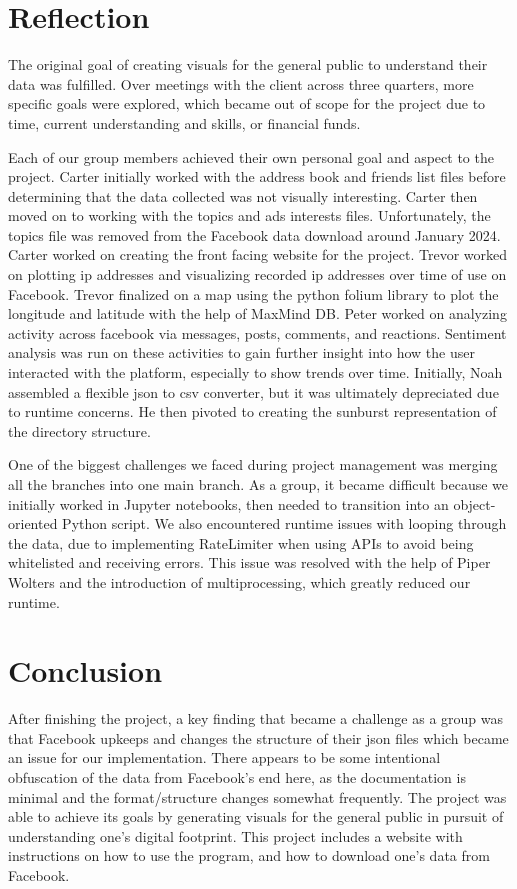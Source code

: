 \documentclass[conference, letterpaper, 11pt]{IEEEtran}
\begin{document}
\section{Reflection} \label{RE}
The original goal of creating visuals for the general public to understand their data was fulfilled. Over meetings with the client across three quarters, more specific goals were explored, which became out of scope for the project due to time, current understanding and skills, or financial funds.

Each of our group members achieved their own personal goal and aspect to the project. Carter initially worked with the address book and friends list files before determining that the data collected was not visually interesting. Carter then moved on to working with the topics and ads interests files. Unfortunately, the topics file was removed from the Facebook data download around January 2024. Carter worked on creating the front facing website for the project. Trevor worked on plotting ip addresses and visualizing recorded ip addresses over time of use on Facebook. Trevor finalized on a map using the python folium library to plot the longitude and latitude with the help of MaxMind DB. Peter worked on analyzing activity across facebook via messages, posts, comments, and reactions. Sentiment analysis was run on these activities to gain further insight into how the user interacted with the platform, especially to show trends over time. Initially, Noah assembled a flexible json to csv converter, but it was ultimately depreciated due to runtime concerns. He then pivoted to creating the sunburst representation of the directory structure.

One of the biggest challenges we faced during project management was merging all the branches into one main branch. As a group, it became difficult because we initially worked in Jupyter notebooks, then needed to transition into an object-oriented Python script. We also encountered runtime issues with looping through the data, due to implementing RateLimiter when using APIs to avoid being whitelisted and receiving errors. This issue was resolved with the help of Piper Wolters and the introduction of multiprocessing, which greatly reduced our runtime.

\section{Conclusion} \label{CO}
After finishing the project, a key finding that became a challenge as a group was that Facebook upkeeps and changes the structure of their json files which became an issue for our implementation. There appears to be some intentional obfuscation of the data from Facebook's end here, as the documentation is minimal and the format/structure changes somewhat frequently. The project was able to achieve its goals by generating visuals for the general public in pursuit of understanding one's digital footprint. This project includes a website with instructions on how to use the program, and how to download one's data from Facebook.
\end{document}
